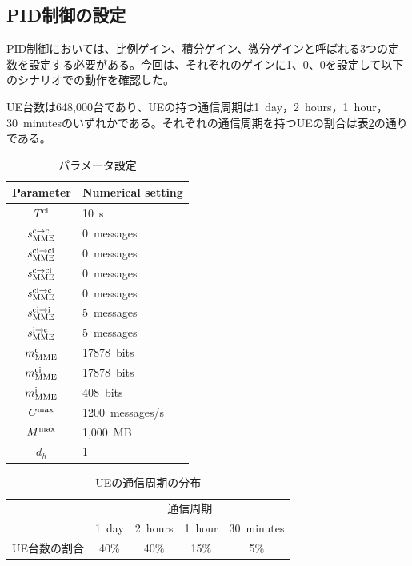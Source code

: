 \documentclass[a4j]{ujarticle}
\begin{document}
\subsection{PID制御の設定}
PID制御においては、比例ゲイン、積分ゲイン、微分ゲインと呼ばれる3つの定数を設定する必要がある。今回は、それぞれのゲインに1、0、0を設定して以下のシナリオでの動作を確認した。

UE台数は648,000台であり、UEの持つ通信周期は1~day，2~hours，1~hour，30~minutesのいずれかである。それぞれの通信周期を持つUEの割合は表\ref{table:interval}の通りである。
\begin{table}[htbp]
  \centering
  \caption{パラメータ設定}
  \label{table:parameter}
  \begin{tabular}{c|l}
    \hline
    Parameter  & Numerical setting \\\hline \hline
    $T^{\rm ci}$ & 10~s\\
    $s_{\rm MME}^{\rm c \to \rm c}$ & 0~messages\\
    $s_{\rm MME}^{\rm ci \to \rm ci}$ & 0~messages\\
    $s_{\rm MME}^{\rm c \to \rm ci}$ & 0~messages\\
    $s_{\rm MME}^{\rm ci \to \rm c}$ & 0~messages\\
    $s_{\rm MME}^{\rm ci \to \rm i}$ & 5~messages\\
    $s_{\rm MME}^{\rm i \to \rm c}$ & 5~messages\\
    $m^{\rm c}_{\rm MME}$ & 17878~bits\\
    $m^{\rm ci}_{\rm MME}$ & 17878~bits\\
    $m^{\rm i}_{\rm MME}$ & 408~bits\\
    $C^{\rm max}$ & 1200~messages/s\\
    $M^{\rm max}$ & 1,000~MB\\
    $d_h$ & 1 \\\hline
  \end{tabular}
\end{table}

\begin{table}[htbp]
  \centering
  \caption{UEの通信周期の分布}
  \label{table:interval}
  \begin{tabular}{c|cccc}
    \hline
    &\multicolumn{4}{c}{通信周期} \\
    & 1~day & 2~hours & 1~hour & 30~minutes \\\hline \hline
    UE台数の割合 & 40\% & 40\% & 15\% & 5\% \\\hline
  \end{tabular}
\end{table}
\end{document}
